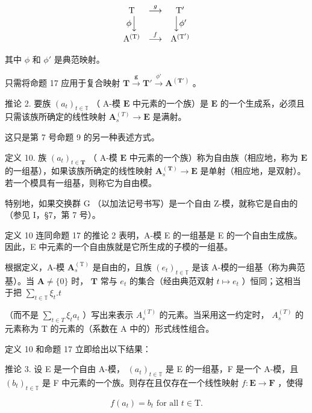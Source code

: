 \[
\begin{array}{c c c} \mathrm{T} & \stackrel {{g}} {{\longrightarrow}} & \mathrm{T} ^ {\prime} \\ \phi \Big \downarrow & & \Big \downarrow \phi^ {\prime} \\ \mathrm{A} ^ {(\mathrm{T})} & \stackrel {{f}} {{\longrightarrow}} & \mathrm{A} ^ {(\mathrm{T} ^ {\prime})} \end{array}
\]

其中 \(\phi\) 和 \(\phi'\) 是典范映射。

只需将命题 17 应用于复合映射 \(\mathbf{T} \xrightarrow{\pmb{g}} \mathbf{T}' \xrightarrow{\phi'} \mathbf{A}^{(\mathbf{T}')}\) 。

推论 2. 要族 \((a_{t})_{t\in \mathbb{T}}\) （ A-模 \(\mathbf{E}\) 中元素的一个族）是 \(\mathbf{E}\) 的一个生成系，必须且只需该族所确定的线性映射 \(\mathbf{A}_{s}^{(T)}\to \mathbf{E}\) 是满射。

这只是第 7 号命题 9 的另一种表述方式。

定义 10. 族 \((a_{t})_{t\in \mathbf{T}}\) （ A-模 \(\mathbf{E}\) 中元素的一个族）称为自由族（相应地，称为 \(\mathbf{E}\) 的一组基），如果该族所确定的线性映射 \(\mathbf{A}_{s}^{(\mathbf{T})}\to \mathbf{E}\) 是单射（相应地，是双射）。若一个模具有一组基，则称它为自由模。

特别地，如果交换群 G （以加法记号书写）是一个自由 Z-模，就称它是自由的（参见 I，§7，第 7 号）。

定义 10 连同命题 17 的推论 2 表明，A-模 E 的一组基是 E 的一个自由生成族。因此，E 中元素的一个自由族就是它所生成的子模的一组基。

根据定义，A-模 \(\mathbf{A}_s^{(\mathrm{T})}\) 是自由的，且族 \((e_t)_{t\in \mathbb{T}}\) 是该 A-模的一组基（称为典范基）。当 \(\mathbf{A}\neq \{0\}\) 时， \(\mathbf{T}\) 常与 \(e_t\) 的集合（经由典范双射 \(t\mapsto e_t\) ）恒同；这相当于把 \(\sum_{t\in \mathbb{T}}\xi_t.t\)

（而不是 \(\sum_{t\in T}\xi_{t}a_{t}\) ）写出来表示 \(A_{s}^{(T)}\) 的元素。当采用这一约定时， \(A_{s}^{(T)}\) 的元素称为 T 的元素的（系数在 A 中的）形式线性组合。

定义 10 和命题 17 立即给出以下结果：

推论 3. 设 E 是一个自由 A-模， \((a_{t})_{t\in \mathbb{T}}\) 是 E 的一组基，F 是一个 A-模，且 \((b_{t})_{t\in \mathbb{T}}\) 是 F 中元素的一个族。则存在且仅存在一个线性映射 \(f:\mathbf{E}\to \mathbf{F}\) ，使得

\[
f (a _ {t}) = b _ {t} \text {   for   all   } t \in \mathrm{T}.\tag{45}
\]

